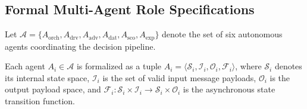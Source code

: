 \documentclass[preprint,12pt,authoryear]{elsarticle}
\begin{document}
\subsection{Formal Multi-Agent Role Specifications}
Let $\mathcal{A} = \{A_{\text{orch}}, A_{\text{drv}}, A_{\text{adv}}, A_{\text{dat}}, A_{\text{sco}}, A_{\text{exp}}\}$ denote the set of six autonomous agents coordinating the decision pipeline.

\begin{definition}
Each agent $A_i \in \mathcal{A}$ is formalized as a tuple $A_i = \langle \mathcal{S}_i, \mathcal{I}_i, \mathcal{O}_i, \mathcal{F}_i \rangle$, where $\mathcal{S}_i$ denotes its internal state space, $\mathcal{I}_i$ is the set of valid input message payloads, $\mathcal{O}_i$ is the output payload space, and $\mathcal{F}_i: \mathcal{S}_i \times \mathcal{I}_i \to \mathcal{S}_i \times \mathcal{O}_i$ is the asynchronous state transition function.
\end{definition}
\end{document}
